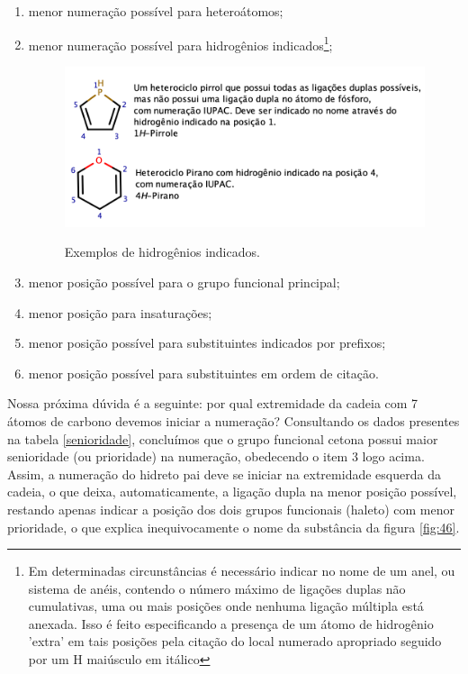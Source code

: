 \documentclass[a4paper,12pt]{book}
\begin{document}
\begin{enumerate}
	\item menor numeração possível para heteroátomos;
	\item menor numeração possível para hidrogênios indicados\footnote{Em determinadas circunstâncias é necessário indicar no nome de um anel, ou sistema de anéis, contendo o número máximo de ligações duplas não cumulativas, uma ou mais posições onde nenhuma ligação múltipla está anexada. Isso é feito especificando a presença de um átomo de hidrogênio 'extra' em tais posições pela citação do local numerado apropriado seguido por um H maiúsculo em itálico};
	
	\begin{figure}[h]
		\centering
		\caption{Exemplos de hidrogênios indicados.}
		\vspace{0.5cm}
		\includegraphics[width=1\linewidth]{imagens/indicado.png}
	\label{fig:indicado}
	\end{figure}

	\item menor posição possível para o grupo funcional principal;
	\item menor posição para insaturações;
	\item menor posição possível para substituintes indicados por prefixos;
	\item menor posição possível para substituintes em ordem de citação.
\end{enumerate}

Nossa próxima dúvida é a seguinte: por qual extremidade da cadeia com 7 átomos de carbono devemos iniciar a numeração? Consultando os dados presentes na tabela \ref{senioridade}, concluímos que o grupo funcional cetona possui maior senioridade (ou prioridade) na numeração, obedecendo o item 3 logo acima. Assim, a numeração do hidreto pai deve se iniciar na extremidade esquerda da cadeia, o que deixa, automaticamente, a ligação dupla na menor posição possível, restando apenas indicar a posição dos dois grupos funcionais (haleto) com menor prioridade, o que explica inequivocamente o nome da substância da figura \ref{fig:46}.
\end{document}
